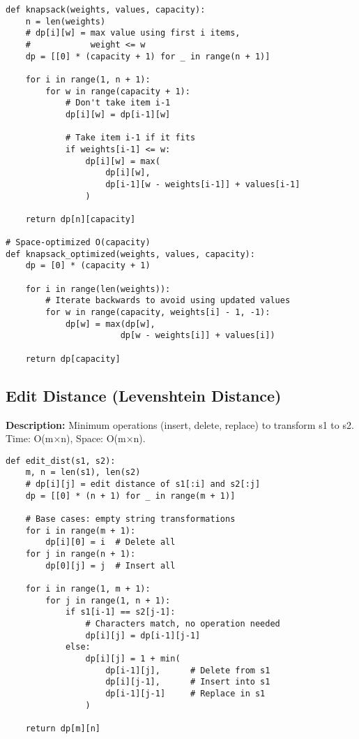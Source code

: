 \begin{lstlisting}
def knapsack(weights, values, capacity):
    n = len(weights)
    # dp[i][w] = max value using first i items, 
    #            weight <= w
    dp = [[0] * (capacity + 1) for _ in range(n + 1)]
    
    for i in range(1, n + 1):
        for w in range(capacity + 1):
            # Don't take item i-1
            dp[i][w] = dp[i-1][w]
            
            # Take item i-1 if it fits
            if weights[i-1] <= w:
                dp[i][w] = max(
                    dp[i][w],
                    dp[i-1][w - weights[i-1]] + values[i-1]
                )
    
    return dp[n][capacity]

# Space-optimized O(capacity)
def knapsack_optimized(weights, values, capacity):
    dp = [0] * (capacity + 1)
    
    for i in range(len(weights)):
        # Iterate backwards to avoid using updated values
        for w in range(capacity, weights[i] - 1, -1):
            dp[w] = max(dp[w], 
                       dp[w - weights[i]] + values[i])
    
    return dp[capacity]
\end{lstlisting}

\subsection{Edit Distance (Levenshtein Distance)}
\textbf{Description:} Minimum operations (insert, delete, replace) to transform s1 to s2. Time: O(m×n), Space: O(m×n).

\begin{lstlisting}
def edit_dist(s1, s2):
    m, n = len(s1), len(s2)
    # dp[i][j] = edit distance of s1[:i] and s2[:j]
    dp = [[0] * (n + 1) for _ in range(m + 1)]
    
    # Base cases: empty string transformations
    for i in range(m + 1):
        dp[i][0] = i  # Delete all
    for j in range(n + 1):
        dp[0][j] = j  # Insert all
    
    for i in range(1, m + 1):
        for j in range(1, n + 1):
            if s1[i-1] == s2[j-1]:
                # Characters match, no operation needed
                dp[i][j] = dp[i-1][j-1]
            else:
                dp[i][j] = 1 + min(
                    dp[i-1][j],      # Delete from s1
                    dp[i][j-1],      # Insert into s1
                    dp[i-1][j-1]     # Replace in s1
                )
    
    return dp[m][n]
\end{lstlisting}

